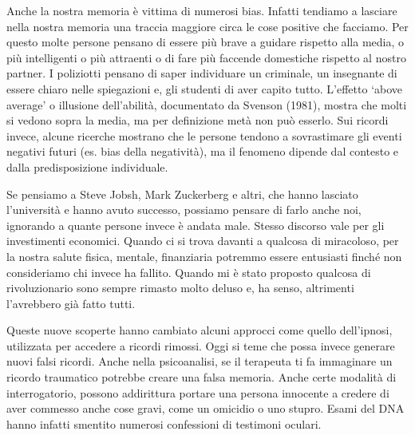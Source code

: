 \documentclass[12pt]{book} %
\begin{document}
\begin{mdframed}[linewidth=1pt]
Anche la nostra memoria è vittima di numerosi bias. Infatti tendiamo a lasciare nella nostra memoria una traccia
maggiore circa le cose positive che facciamo. Per questo molte persone pensano di essere più brave a guidare rispetto
alla media, o più intelligenti o più attraenti o di fare più faccende domestiche rispetto al nostro partner. I
poliziotti pensano di saper individuare un criminale, un insegnante di essere chiaro nelle spiegazioni e, gli studenti
di aver capito tutto. 
L’effetto ‘above average’ o illusione dell’abilità, documentato da Svenson (1981), mostra che molti si vedono sopra la media, ma per definizione metà non può esserlo.
Sui ricordi invece, alcune ricerche mostrano che le persone tendono a sovrastimare gli eventi negativi futuri (es. bias della negatività), ma il fenomeno dipende dal contesto e dalla predisposizione individuale.

Se pensiamo a Steve Jobsh, Mark Zuckerberg e altri, che hanno lasciato l'università e hanno avuto successo, possiamo pensare di farlo
anche noi, ignorando a quante persone invece è andata male. Stesso discorso vale per gli investimenti economici. Quando
ci si trova davanti a qualcosa di miracoloso, per la nostra salute fisica, mentale, finanziaria potremmo essere
entusiasti finché non consideriamo chi invece ha fallito. Quando mi è stato proposto qualcosa di
rivoluzionario sono sempre rimasto molto deluso e, ha senso, altrimenti l'avrebbero già fatto tutti.

Queste nuove scoperte hanno cambiato alcuni approcci come quello dell'ipnosi, utilizzata per accedere a ricordi rimossi.
Oggi si teme che possa invece generare nuovi falsi ricordi. 
Anche nella psicoanalisi, se il terapeuta ti fa immaginare un ricordo traumatico potrebbe creare una
falsa memoria. Anche certe modalità di interrogatorio, possono addirittura portare una persona innocente a credere di
aver commesso anche cose gravi, come un omicidio o uno stupro. Esami del DNA hanno infatti smentito numerosi confessioni di testimoni oculari.


\end{mdframed}
\end{document}
